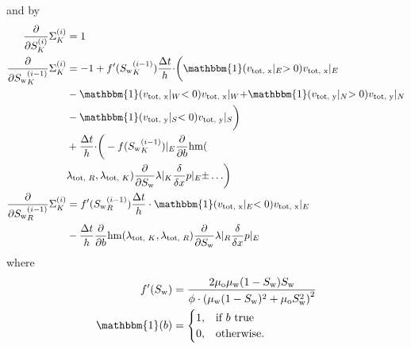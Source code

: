 \documentclass[twoside]{IEEEtran}
\newcommand*{\indicator}{\ensuremath{\mathbb{1}}}
\newcommand*{\pdiff}[2]{\ensuremath{\frac{\partial}{\partial{#2}}{#1}}}
\newcommand*{\ddiff}[2]{\ensuremath{\frac{\delta}{\delta{#2}}{#1}}}
\renewcommand*{\indicator}{\ensuremath{\mathbbm{1}}}
\DeclareMathOperator*{\hmean}{hm}
\begin{document}
and by
\begin{align}
\pdiff{\Sigma_K^{(i)}}{S_K^{(i)}} &= 1 \\
\pdiff{\Sigma_K^{(i)}}{{S_{\text{w}}}_K^{(i-1)}} &=  -1 + f^\prime({S_{\text{w}}}_K^{(i-1)}) \frac{\Delta t}{h}\cdot \biggr(\indicator(v_\text{tot, x}\lvert_E > 0) v_\text{tot, x}\lvert_E \\&- \indicator(v_\text{tot, x}\lvert_W < 0) v_\text{tot, x}\lvert_W + \indicator(v_\text{tot, y}\lvert_N > 0) v_\text{tot, y}\lvert_N  \nonumber\\&- \indicator(v_\text{tot, y}\lvert_S < 0) v_\text{tot, y}\lvert_S\biggr) \nonumber\\ &+\frac{\Delta t}{h}\cdot\biggr(-f({S_{\text{w}}}_K^{(i-1)})\lvert_E \pdiff{\hmean}{b}(\nonumber\\&\lambda_{\text{tot, }R}, \lambda_{\text{tot, }K}) \pdiff{\lambda}{S_\text{w}}\lvert_K \ddiff{p}{x}\lvert_E\pm \ldots\biggr) \nonumber\\
\pdiff{\Sigma_K^{(i)}}{{S_{\text{w}}}_R^{(i-1)}} &= f^\prime({S_{\text{w}}}_R^{(i-1)}) \frac{\Delta t}{h}\cdot \indicator(v_\text{tot, x}\lvert_E < 0) v_\text{tot, x}\lvert_E \nonumber\\&- \frac{\Delta t}{h} \pdiff{\hmean}{b}(\lambda_{\text{tot, }K}, \lambda_{\text{tot, }R}) \pdiff{\lambda}{S_\text{w}}\lvert_R \ddiff{p}{x}\lvert_E
\end{align}
where
\begin{align}
f^\prime(S_\text{w}) &=  \frac{2\mu_\text{o}\mu_\text{w} (1 - S_\text{w})S_\text{w}}{\phi \cdot \left(\mu_\text{w}(1 - S_\text{w})^2 + \mu_\text{o}S_\text{w}^2\right)^2}\\
\indicator(b) &= \begin{cases} 1, &\text{if } b \text{ true} \\ 0, &\text{otherwise.}
\end{cases}
\end{align}
\end{document}
